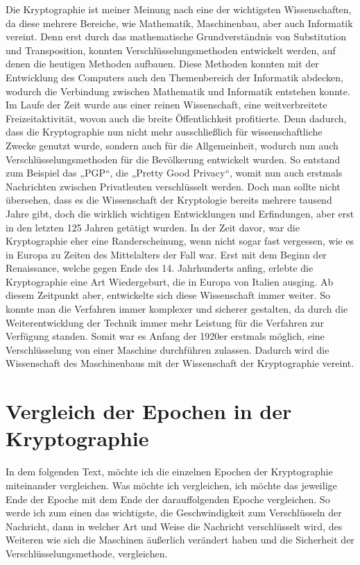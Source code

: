 Die Kryptographie ist meiner Meinung nach eine der wichtigsten Wissenschaften, da diese mehrere Bereiche, wie Mathematik, Maschinenbau, aber auch Informatik vereint. Denn erst durch das mathematische Grundverständnis von Substitution und Transposition, konnten Verschlüsselungsmethoden entwickelt werden, auf denen die heutigen Methoden aufbauen. Diese Methoden konnten mit der Entwicklung des Computers auch den Themenbereich der Informatik abdecken, wodurch die Verbindung zwischen Mathematik und Informatik entstehen konnte. Im Laufe der Zeit wurde aus einer reinen Wissenschaft, eine weitverbreitete Freizeitaktivität, wovon auch die breite Öffentlichkeit profitierte. Denn dadurch, dass die Kryptographie nun nicht mehr ausschließlich für wissenschaftliche Zwecke genutzt wurde, sondern auch für die Allgemeinheit, wodurch nun auch Verschlüsselungsmethoden für die Bevölkerung entwickelt wurden. So entstand zum Beispiel das „PGP“, die „Pretty Good Privacy“, womit nun auch erstmals Nachrichten zwischen Privatleuten verschlüsselt werden. Doch man sollte nicht übersehen, dass es die Wissenschaft der Kryptologie bereits mehrere tausend Jahre gibt, doch die wirklich wichtigen Entwicklungen und Erfindungen, aber erst in den letzten 125 Jahren getätigt wurden. In der Zeit davor, war die Kryptographie eher eine Randerscheinung, wenn nicht sogar fast vergessen, wie es in Europa zu Zeiten des Mittelalters der Fall war. Erst mit dem Beginn der Renaissance, welche gegen Ende des 14. Jahrhunderts anfing, erlebte die Kryptographie eine Art Wiedergeburt, die in Europa von Italien ausging. Ab diesem Zeitpunkt aber, entwickelte sich diese Wissenschaft immer weiter. So konnte man die Verfahren immer komplexer und sicherer gestalten, da durch die Weiterentwicklung der Technik immer mehr Leistung für die Verfahren zur Verfügung standen. Somit war es Anfang der 1920er erstmals möglich, eine Verschlüsselung von einer Maschine durchführen zulassen. Dadurch wird die Wissenschaft des Maschinenbaus mit der Wissenschaft der Kryptographie vereint.


\section{Vergleich der Epochen in der Kryptographie}
In dem folgenden Text, möchte ich die einzelnen Epochen der Kryptographie miteinander vergleichen. Was möchte ich vergleichen, ich möchte das jeweilige Ende der Epoche mit dem Ende der darauffolgenden Epoche vergleichen. So werde ich zum einen das wichtigste, die Geschwindigkeit zum Verschlüsseln der Nachricht, dann in welcher Art und Weise die Nachricht verschlüsselt wird, des Weiteren wie sich die Maschinen äußerlich verändert haben und die Sicherheit der Verschlüsselungsmethode, vergleichen.\\



